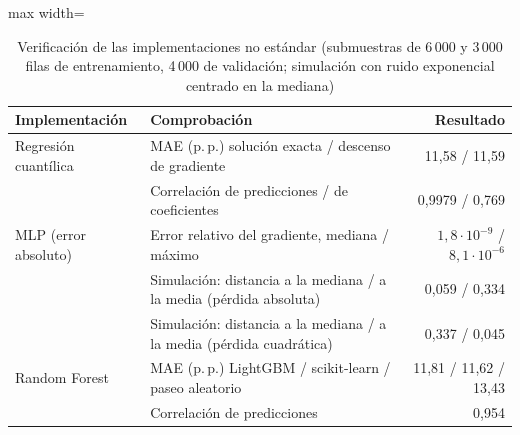 \begin{table}[htbp]\centering\footnotesize
\caption{Verificación de las implementaciones no estándar (submuestras de 6\,000 y 3\,000 filas de entrenamiento, 4\,000 de validación; simulación con ruido exponencial centrado en la mediana)}\label{tab:verificacion}
\begin{adjustbox}{max width=\textwidth}\begin{tabular}{llr}\toprule
Implementación & Comprobación & Resultado\\ \midrule
Regresión cuantílica & MAE (p.\,p.) solución exacta / descenso de gradiente & 11{,}58 / 11{,}59 \\
 & Correlación de predicciones / de coeficientes & 0{,}9979 / 0{,}769 \\
MLP (error absoluto) & Error relativo del gradiente, mediana / máximo & $1{,}8\cdot10^{-9}$ / $8{,}1\cdot10^{-6}$ \\
 & Simulación: distancia a la mediana / a la media (pérdida absoluta) & 0{,}059 / 0{,}334 \\
 & Simulación: distancia a la mediana / a la media (pérdida cuadrática) & 0{,}337 / 0{,}045 \\
Random Forest & MAE (p.\,p.) LightGBM / scikit-learn / paseo aleatorio & 11{,}81 / 11{,}62 / 13{,}43 \\
 & Correlación de predicciones & 0{,}954 \\
\bottomrule\end{tabular}\end{adjustbox}\end{table}
